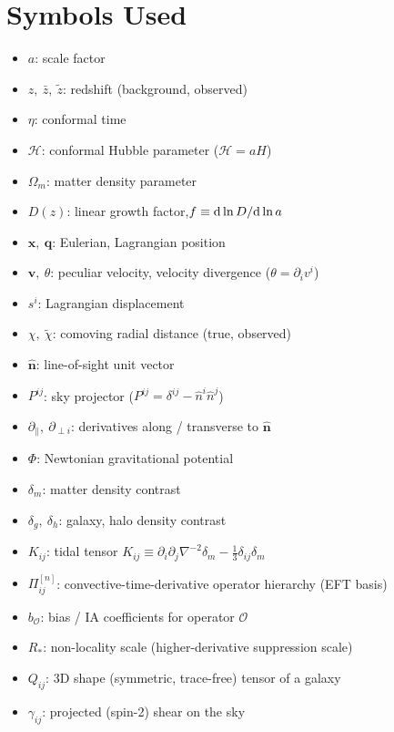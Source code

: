 \documentclass[11pt]{article}
\DeclareRobustCommand{\d}{\ifmmode\text{d}\else d\fi}
\newcommand{\Rstar}{R_\ast}
\begin{document}
\section*{Symbols Used}
\small
\begin{itemize}
    \item[]$a$: scale factor
    \item[]$z,\ \bar z,\ \tilde z$: redshift (background, observed)
    \item[]$\eta$: conformal time
    \item[]$\mathcal H$: conformal Hubble parameter ($\mathcal H=aH$)
    \item[]$\Omega_m$: matter density parameter
    \item[]$D(z)$: linear growth factor,\quad $f \equiv \d\ln D/\d\ln a$
    \item[]$\mathbf x,\ \mathbf q$: Eulerian, Lagrangian position
    \item[]$\mathbf v,\ \theta$: peculiar velocity, velocity divergence ($\theta=\partial_i v^i$)
    \item[]$s^i$: Lagrangian displacement
    \item[]$\chi,\ \tilde\chi$: comoving radial distance (true, observed)
    \item[]$\hat{\mathbf n}$: line-of-sight unit vector
    \item[]$P^{ij}$: sky projector ($P^{ij}=\delta^{ij}-\hat n^i\hat n^j$)
    \item[]$\partial_\parallel,\ \partial_{\perp i}$: derivatives along / transverse to $\hat{\mathbf n}$
    \item[]$\Phi$: Newtonian gravitational potential
    \item[]$\delta_m$: matter density contrast
    \item[]$\delta_g,\ \delta_h$: galaxy, halo density contrast
    \item[]$K_{ij}$: tidal tensor $K_{ij}\equiv \partial_i\partial_j\nabla^{-2}\delta_m-\tfrac13\delta_{ij}\delta_m$
    \item[]$\Pi^{[n]}_{ij}$: convective-time-derivative operator hierarchy (EFT basis)
    \item[]$b_{\mathcal O}$: bias / IA coefficients for operator $\mathcal O$
    \item[]$\Rstar$: non-locality scale (higher-derivative suppression scale)
    \item[]$Q_{ij}$: 3D shape (symmetric, trace-free) tensor of a galaxy
    \item[]$\gamma_{ij}$: projected (spin-2) shear on the sky

\end{itemize}
\end{document}
